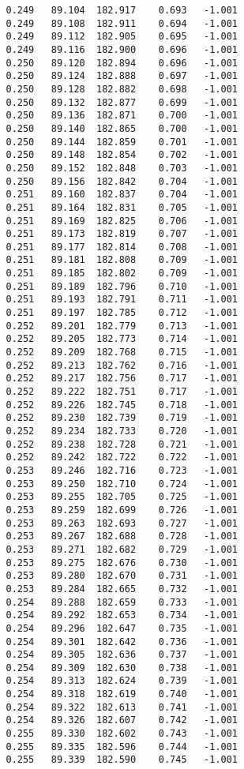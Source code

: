 \begin{verbatim}
   0.249   89.104  182.917    0.693   -1.001
   0.249   89.108  182.911    0.694   -1.001
   0.249   89.112  182.905    0.695   -1.001
   0.249   89.116  182.900    0.696   -1.001
   0.250   89.120  182.894    0.696   -1.001
   0.250   89.124  182.888    0.697   -1.001
   0.250   89.128  182.882    0.698   -1.001
   0.250   89.132  182.877    0.699   -1.001
   0.250   89.136  182.871    0.700   -1.001
   0.250   89.140  182.865    0.700   -1.001
   0.250   89.144  182.859    0.701   -1.001
   0.250   89.148  182.854    0.702   -1.001
   0.250   89.152  182.848    0.703   -1.001
   0.250   89.156  182.842    0.704   -1.001
   0.251   89.160  182.837    0.704   -1.001
   0.251   89.164  182.831    0.705   -1.001
   0.251   89.169  182.825    0.706   -1.001
   0.251   89.173  182.819    0.707   -1.001
   0.251   89.177  182.814    0.708   -1.001
   0.251   89.181  182.808    0.709   -1.001
   0.251   89.185  182.802    0.709   -1.001
   0.251   89.189  182.796    0.710   -1.001
   0.251   89.193  182.791    0.711   -1.001
   0.251   89.197  182.785    0.712   -1.001
   0.252   89.201  182.779    0.713   -1.001
   0.252   89.205  182.773    0.714   -1.001
   0.252   89.209  182.768    0.715   -1.001
   0.252   89.213  182.762    0.716   -1.001
   0.252   89.217  182.756    0.717   -1.001
   0.252   89.222  182.751    0.717   -1.001
   0.252   89.226  182.745    0.718   -1.001
   0.252   89.230  182.739    0.719   -1.001
   0.252   89.234  182.733    0.720   -1.001
   0.252   89.238  182.728    0.721   -1.001
   0.252   89.242  182.722    0.722   -1.001
   0.253   89.246  182.716    0.723   -1.001
   0.253   89.250  182.710    0.724   -1.001
   0.253   89.255  182.705    0.725   -1.001
   0.253   89.259  182.699    0.726   -1.001
   0.253   89.263  182.693    0.727   -1.001
   0.253   89.267  182.688    0.728   -1.001
   0.253   89.271  182.682    0.729   -1.001
   0.253   89.275  182.676    0.730   -1.001
   0.253   89.280  182.670    0.731   -1.001
   0.253   89.284  182.665    0.732   -1.001
   0.254   89.288  182.659    0.733   -1.001
   0.254   89.292  182.653    0.734   -1.001
   0.254   89.296  182.647    0.735   -1.001
   0.254   89.301  182.642    0.736   -1.001
   0.254   89.305  182.636    0.737   -1.001
   0.254   89.309  182.630    0.738   -1.001
   0.254   89.313  182.624    0.739   -1.001
   0.254   89.318  182.619    0.740   -1.001
   0.254   89.322  182.613    0.741   -1.001
   0.254   89.326  182.607    0.742   -1.001
   0.255   89.330  182.602    0.743   -1.001
   0.255   89.335  182.596    0.744   -1.001
   0.255   89.339  182.590    0.745   -1.001

\end{verbatim}
